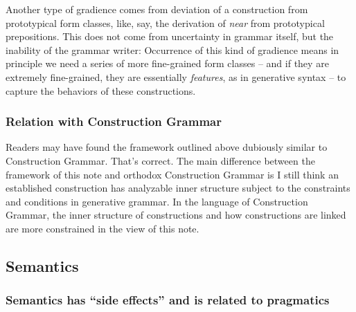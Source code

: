 \documentclass[UTF8, a4paper, oneside, scheme=plain]{ctexrep}
\newcommand{\corpus}[1]{\emph{#1}}
\begin{document}
Another type of gradience comes from deviation of a construction
from prototypical form classes,
like, say, the derivation of \corpus{near} from prototypical prepositions.
This does not come from uncertainty in grammar itself, 
but the inability of the grammar writer:
Occurrence of this kind of gradience means 
in principle we need a series of more fine-grained form classes 
-- and if they are extremely fine-grained, they are essentially \emph{features},
as in generative syntax --
to capture the behaviors of these constructions.

\subsubsection{Relation with Construction Grammar}

Readers may have found the framework outlined above dubiously similar to Construction Grammar.
That's correct.
The main difference between the framework of this note and orthodox Construction Grammar is 
I still think an established construction 
has analyzable inner structure 
subject to the constraints and conditions in generative grammar.
In the language of Construction Grammar,
the inner structure of constructions and how constructions are linked are more constrained 
in the view of this note.

\subsection{Semantics}\label{sec:semantics}

\subsubsection{Semantics has ``side effects'' and is related to pragmatics}\label{sec:semantics.side-effect}
\end{document}

